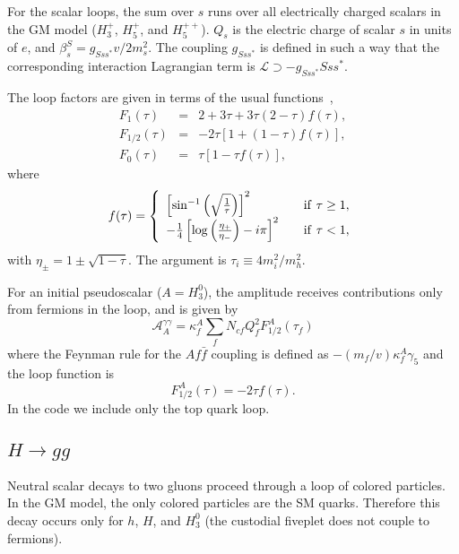 \documentclass[11pt]{article}
\begin{document}
For the scalar loops, the sum over $s$ runs over all electrically charged scalars in the GM model ($H_3^+$, $H_5^+$, and $H_5^{++}$).  $Q_s$ is the electric charge of scalar $s$ in units of $e$, and $\beta_s^S = g_{Sss^*} v/2 m_s^2$.  The coupling $g_{Sss^*}$ is defined in such a way that the corresponding interaction Lagrangian term is $\mathcal{L} \supset - g_{Sss^*} S s s^*$.

The loop factors are given in terms of the usual functions~\cite{HHG}, 
\begin{eqnarray}
	F_1(\tau) &=& 2+3\tau+3\tau(2-\tau) f(\tau), \nonumber \\
	F_{1/2}(\tau) &=& -2\tau[1+(1-\tau) f(\tau)], \nonumber \\
	F_0(\tau) &=& \tau[1-\tau f(\tau)],
\end{eqnarray}
where
\begin{equation}
	f(\tau) = \left\{ \begin{array}{l l}
	\left[\sin^{-1} \left(\sqrt{\frac{1}{\tau}}\right) \right]^2 & \quad  {\rm if} \ \tau \geq 1, \\
	-\frac{1}{4}\left[ \log \left(\frac{\eta_+}{\eta_-}\right) - i \pi \right]^2 & \quad  {\rm if} \ \tau < 1, \\
	\end{array} \right.
	\label{feq}
\end{equation}
with $\eta_{\pm} = 1 \pm \sqrt{1-\tau}$.  The argument is $\tau_i \equiv 4 m_i^2/ m_h^2$. 

For an initial pseudoscalar ($A = H_3^0$), the amplitude receives contributions only from fermions in the loop, and is given by
\begin{equation}
	\mathcal{A}_A^{\gamma\gamma} = \kappa_f^A \sum_f N_{cf} Q_f^2 F_{1/2}^A(\tau_f)
\end{equation}
where the Feynman rule for the $A f \bar f$ coupling is defined as $- (m_f/v) \kappa_f^A \gamma_5$ and the loop function is
\begin{equation}
	F_{1/2}^A(\tau) = -2 \tau f(\tau).
\end{equation}
In the code we include only the top quark loop.

\subsection{$H \to gg$}

Neutral scalar decays to two gluons proceed through a loop of colored particles.  In the GM model, the only colored particles are the SM quarks.  Therefore this decay occurs only for $h$, $H$, and $H_3^0$ (the custodial fiveplet does not couple to fermions).
\end{document}
